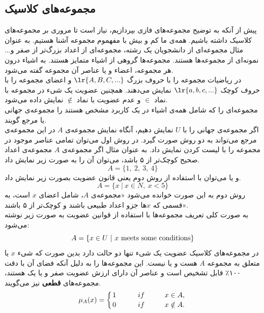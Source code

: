 \documentclass[12pt,a4paper]{article}
\begin{document}
 \subsection{مجموعه‌های کلاسیک}
پیش از آنکه به توضیح مجموعه‌های فازی بپردازیم، نیاز است تا مروری بر مجموعه‌های کلاسیک داشته باشیم. همه‌ی ما کم و بیش با مفهموم مجموعه آشنا هستیم. به عنوان مثال مجموعه‌ای از دانشجویان یک رشته، مجموعه‌ای از اعداد بزرگ‌تر از صفر و... نمونه‌ای از مجموعه‌ها هستند. مجموعه‌ها گروهی از اشیاء متمایز هستند. به اشیاء درون هر مجموعه، اعضاء و یا عناصر آن مجموعه گفته می‌شود. \\
در ریاضیات مجموعه را با حروف بزرگ 
$\lr{A,B,C,...}$
 و اعضای مجموعه را با حروف کوچک 
$\lr{a,b,c,...} $
  نمایش می‌دهند. همچنین عضویت یک شیء در مجموعه با نماد 
$\in$
 و عدم عضویت با نماد
 $\notin$
 نمایش داده می‌شود. 
 \cite{Bojadziev2007}
 \\
مجموعه‌ای را که شامل همه‌ی اشیاء در یک کاربرد مشخص هستند را مجموعه‌ی جهانی 
یا مرجع گویند. \\
اگر مجموعه‌ی جهانی را با $ U $  نمایش دهیم، آنگاه نمایش مجموعه‌ی $ A $  در این مجموعه‌ی مرجع می‌تواند به دو روش صورت گیرد. در روش اول می‌توان تمامی عناصر موجود در مجموعه را با لیست کردن 
نمایش داد. به عنوان مثال اگر مجموعه‌ی $ A $ مجموعه‌ی اعداد صحیح کوچک‌تر از ۵ باشد، می‌توان آن را به صورت زیر نمایش داد.
\begin{equation}
A=\{1,\ 2,\ 3,\ 4\}
\end{equation}
و یا می‌توان با استفاده از روش دوم یعنی قانون عضویت
بصورت زیر نمایش داد.
\cite{Wang1997}
\begin{equation}
 A= \{ x\ |\ x \in N,\ x < 5\} 
 \end{equation}
 روش دوم به این صورت خوانده می‌شود «مجموعه‌ی $ A $، شامل اعضای $ x $ است، به قسمی که  $ x $ها جزو اعداد طبیعی باشند و کوچک‌تر از ۵ باشند».\\
 به صورت کلی تعریف مجموعه‌ها با استفاده از قوانین عضویت به صورت زیر نوشته می‌شود:
\begin{equation}
 A= \{  x \in U\ |\   x\ {\rm meets\ some\ conditions } \}
 \end{equation} 
 در مجموعه‌های کلاسیک عضویت یک شیء تنها دو حالت دارد بدین صورت که شیء $x$ یا متعلق به مجموعه $A$ هست و یا نیست. این مجموعه‌ها را به دلیل آنکه فضای آن با دقت ۱۰۰٪ قابل تشخیص است و عناصر آن دارای ارزش عضویت صفر و یا یک هستند، مجموعه‌های
  \textbf{قطعی}
  نیز می‌گویند. 
\begin{equation}\label{f_2}
\mu_{A}(x)=\left \{ 
	{1 \atop 0}
	\hskip 1cm
   {if \hskip 1cm x \in A, \atop
	if \hskip 1cm x \notin A.} \right.
\end{equation} 
\end{document}
